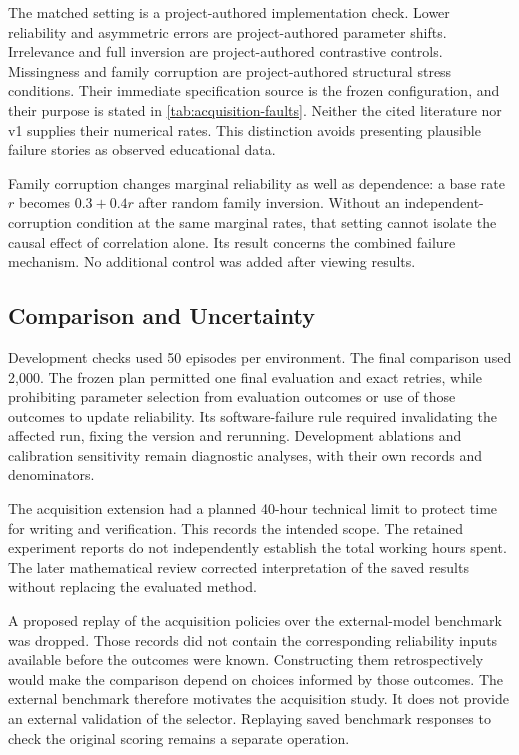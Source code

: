 The matched setting is a project-authored implementation check. Lower reliability and
asymmetric errors are project-authored parameter shifts. Irrelevance and full inversion are project-authored contrastive controls.
Missingness and family corruption are project-authored structural stress conditions. Their immediate specification source is the
frozen configuration, and their purpose is stated in \cref{tab:acquisition-faults}. Neither the cited literature nor v1 supplies
their numerical rates. This distinction avoids presenting plausible failure stories as observed educational data.

Family corruption changes marginal reliability as well as dependence: a base rate $r$ becomes $0.3+0.4r$ after random family
inversion. Without an independent-corruption condition at the same marginal rates, that setting cannot isolate the causal effect
of correlation alone. Its result concerns the combined failure mechanism. No additional control was added after viewing results.

\subsection{Comparison and Uncertainty}

Development checks used 50 episodes per environment. The final comparison used 2,000. The frozen plan permitted one final
evaluation and exact retries, while prohibiting parameter selection from evaluation outcomes or use of those outcomes to
update reliability. Its software-failure rule required invalidating the affected run, fixing the version and rerunning.
Development ablations and calibration sensitivity remain diagnostic analyses, with their own records and denominators.

The acquisition extension had a planned 40-hour technical limit to protect time for writing and verification. This records
the intended scope. The retained experiment reports do not independently establish the total working hours spent. The later
mathematical review corrected interpretation of the saved results without replacing the evaluated method.

A proposed replay of the acquisition policies over the external-model benchmark was dropped. Those records did not contain
the corresponding reliability inputs available before the outcomes were known. Constructing them retrospectively would make
the comparison depend on choices informed by those outcomes. The external benchmark therefore motivates the acquisition
study. It does not provide an external validation of the selector. Replaying saved benchmark responses to check the original
scoring remains a separate operation.

